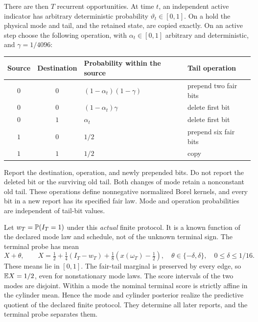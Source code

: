 There are then $T$ recurrent opportunities. At time $t$, an independent active indicator has arbitrary deterministic probability $\vartheta_t\in[0,1]$. On a hold the physical mode and tail, and the retained state, are copied exactly. On an active step choose the following operation, with $\alpha_t\in[0,1]$ arbitrary and deterministic, and $\gamma=1/4096$:
\begin{center}
\begin{tabular}{ccll}
\toprule
Source & Destination & Probability within the source & Tail operation \\
\midrule
$0$ & $0$ & $(1-\alpha_t)(1-\gamma)$ & prepend two fair bits \\
$0$ & $0$ & $(1-\alpha_t)\gamma$ & delete first bit \\
$0$ & $1$ & $\alpha_t$ & delete first bit \\
$1$ & $0$ & $1/2$ & prepend six fair bits \\
$1$ & $1$ & $1/2$ & copy \\
\bottomrule
\end{tabular}
\end{center}
Report the destination, operation, and newly prepended bits. Do not report the deleted bit or the surviving old tail. Both changes of mode retain a nonconstant old tail. These operations define nonnegative normalized Borel kernels, and every bit in a new report has its specified fair law. Mode and operation probabilities are independent of tail-bit values.

Let $w_T=\mathbb P(I_T=1)$ under this \emph{actual} finite protocol. It is a known function of the declared mode law and schedule, not of the unknown terminal sign. The terminal probe has mean
\begin{equation}\label{eq:symbol-score}
 X+\theta,\qquad
 X=\tfrac12+\tfrac14(I_T-w_T)+\tfrac18(x(\omega_T)-\tfrac12),
 \quad \theta\in\{-\delta,\delta\},\quad0\le\delta\le1/16.
\end{equation}
These means lie in $[0,1]$. The fair-tail marginal is preserved by every edge, so $\mathbb E X=1/2$, even for nonstationary mode laws. The score intervals of the two modes are disjoint. Within a mode the nominal terminal score is strictly affine in the cylinder mean. Hence the mode and cylinder posterior realize the predictive quotient of the declared finite protocol. They determine all later reports, and the terminal probe separates them.

